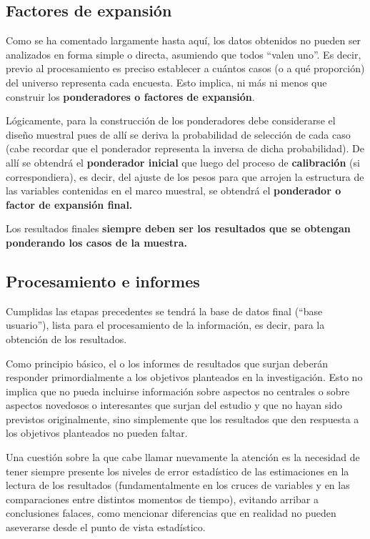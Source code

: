 \documentclass[
]{book}
\begin{document}
\hypertarget{factores-de-expansiuxf3n}{%
\subsection{Factores de expansión}\label{factores-de-expansiuxf3n}}

Como se ha comentado largamente hasta aquí, los datos obtenidos no pueden ser analizados en forma simple o directa, asumiendo que todos ``valen uno''. Es decir, previo al procesamiento es preciso establecer a cuántos casos (o a qué proporción) del universo representa cada encuesta. Esto implica, ni más ni menos que construir los \textbf{ponderadores o factores de expansión}.

Lógicamente, para la construcción de los ponderadores debe considerarse el diseño muestral pues de allí se deriva la probabilidad de selección de cada caso (cabe recordar que el ponderador representa la inversa de dicha probabilidad). De allí se obtendrá el \textbf{ponderador inicial} que luego del proceso de \textbf{calibración} (si correspondiera), es decir, del ajuste de los pesos para que arrojen la estructura de las variables contenidas en el marco muestral, se obtendrá el \textbf{ponderador o factor de expansión final.}

Los resultados finales \textbf{siempre deben ser los resultados que se obtengan ponderando los casos de la muestra.}

\hypertarget{procesamiento-e-informes}{%
\subsection{Procesamiento e informes}\label{procesamiento-e-informes}}

Cumplidas las etapas precedentes se tendrá la base de datos final (``base usuario''), lista para el procesamiento de la información, es decir, para la obtención de los resultados.

Como principio básico, el o los informes de resultados que surjan deberán responder primordialmente a los objetivos planteados en la investigación. Esto no implica que no pueda incluirse información sobre aspectos no centrales o sobre aspectos novedosos o interesantes que surjan del estudio y que no hayan sido previstos originalmente, sino simplemente que los resultados que den respuesta a los objetivos planteados no pueden faltar.

Una cuestión sobre la que cabe llamar nuevamente la atención es la necesidad de tener siempre presente los niveles de error estadístico de las estimaciones en la lectura de los resultados (fundamentalmente en los cruces de variables y en las comparaciones entre distintos momentos de tiempo), evitando arribar a conclusiones falaces, como mencionar diferencias que en realidad no pueden aseverarse desde el punto de vista estadístico.
\end{document}
